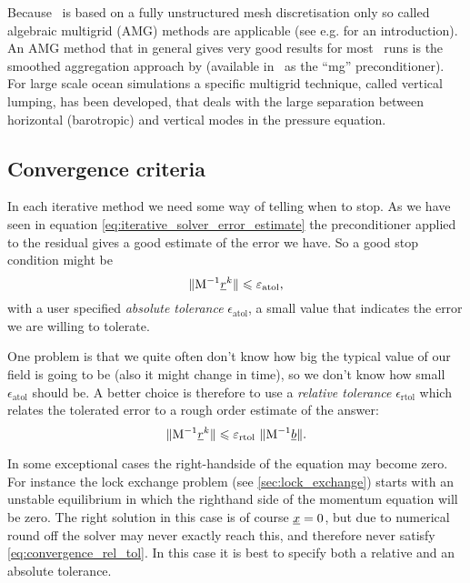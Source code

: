 Because \fluidity\ is based on a fully
unstructured mesh discretisation only so called algebraic multigrid (AMG)
methods are applicable (see e.g. \citet{stueben2001} for an
introduction). An AMG method that in general gives very good
results for most \fluidity\ runs is the smoothed aggregation approach by
\citet{vanek1996} (available in \fluidity\ as the ``mg''
preconditioner). For large scale ocean simulations a specific multigrid
technique, called vertical lumping\citep{kramer2010},
has been developed, that deals with the large separation between
horizontal (barotropic) and vertical modes in the pressure equation.

\subsection{Convergence criteria}
In each iterative method we need some way of telling when to stop.
As we have seen in equation \eqref{eq:iterative_solver_error_estimate}
the preconditioner applied to the residual gives a good estimate of the
error we have. So a good stop condition might be
\begin{equation*}
  \|\mathrm{M}^{-1} \underline{r}^k\| \leqslant \varepsilon_{\text{atol}},
\end{equation*}
with a user specified
\emph{absolute tolerance} $\epsilon_{\text{atol}}$, a small value
that indicates the error we are willing to tolerate.

One problem is that we quite often don't know how big the
typical value of our field is going to be (also it might change in time),
so we don't know how small $\epsilon_{\text{atol}}$ should be.
A better choice is therefore to use a \emph{relative tolerance}
$\epsilon_{\text{rtol}}$
which relates the tolerated error to a rough order estimate of the answer:
\begin{equation}\label{eq:convergence_rel_tol}
  \|\mathrm{M}^{-1} \underline{r}^k\| \leqslant
    \varepsilon_{\text{rtol}}~ \|\mathrm{M}^{-1} \underline{b}\|.
\end{equation}

In some exceptional cases the right-handside of the equation may
become zero. For instance the lock exchange problem
(see \ref{sec:lock_exchange}) starts with an unstable equilibrium in which the righthand
side of the momentum equation will be zero. The right solution in this case
is of course $\underline{x}=0$, but due to numerical round off the solver may
never exactly reach this,
and therefore never satisfy \ref{eq:convergence_rel_tol}. In this case
it is best to specify both a relative and an absolute tolerance.

